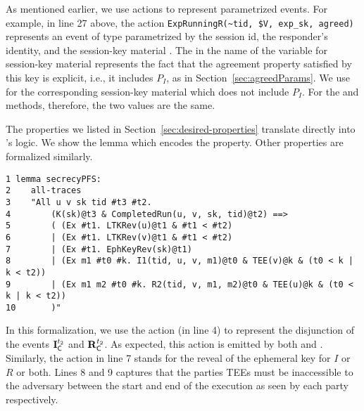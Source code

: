 As mentioned earlier, we use actions to represent parametrized events.
%
For example, in line 27 above, the action
\verb|ExpRunningR(~tid, $V, exp_sk, agreed)| represents an event of type
\mRStart{} parametrized by the session id, the responder's identity, and the
session-key material .
%
The  in the name of the variable for session-key material represents
the fact that the agreement property satisfied by this key is explicit, i.e.,
it includes $P_{I}$, as in Section~\ref{sec:agreedParams}.
%
We use  for the corresponding session-key material which does not
include $P_{I}$.
%
For the \mSigSig{} and \mSigStat{} methods, therefore, the two values are the
same.
%

%

The properties we listed in Section~\ref{sec:desired-properties}
translate directly into \mTamarin's logic.
%
We show the \mTamarin{} lemma which encodes the \mPredPcs{} property.
%
Other properties are formalized similarly. 
%

\begin{small}
\begin{verbatim}
1 lemma secrecyPFS:
2    all-traces
3    "All u v sk tid #t3 #t2.
4        (K(sk)@t3 & CompletedRun(u, v, sk, tid)@t2) ==>
5        ( (Ex #t1. LTKRev(u)@t1 & #t1 < #t2)
6        | (Ex #t1. LTKRev(v)@t1 & #t1 < #t2)
7        | (Ex #t1. EphKeyRev(sk)@t1)
8        | (Ex m1 #t0 #k. I1(tid, u, v, m1)@t0 & TEE(v)@k & (t0 < k | k < t2))
9        | (Ex m1 m2 #t0 #k. R2(tid, v, m1, m2)@t0 & TEE(u)@k & (t0 < k | k < t2))
10       )"
\end{verbatim}
\end{small}
%

In this formalization, we use the action 
(in line 4) to represent the disjunction of the events $\mathbf{I}_{\textsf{C}}^{t_{2}}$
and $\mathbf{R}_{\textsf{C}}^{t_{2}}$.
%
As expected, this action is emitted by both  and .
%
Similarly, the action  in line 7 stands for the reveal of
the ephemeral key for $I$ or $R$ or both.
%
Lines 8 and 9 captures that the parties TEEs must be inaccessible to the
adversary between the start and end of the execution as seen by each party
respectively.
%
